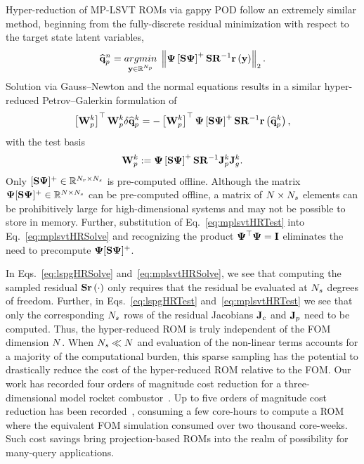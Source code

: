 Hyper-reduction of MP-LSVT ROMs via gappy POD follow an extremely similar method, beginning from the fully-discrete residual minimization with respect to the target state latent variables,
%
\begin{equation}
    \primVecCoef^{\timeIdx} = \argmin{\dummyVec \inROne{\numPrimModes}} \left\Vert \deimBasis \left[ \sampMat \deimBasis \right]^{+} \sampMat \resScaleInv \resFunc{\dummyVec} \right\Vert_2.
\end{equation}
%
Solution via Gauss--Newton and the normal equations results in a similar hyper-reduced Petrov--Galerkin formulation of
%
\begin{equation}\label{eq:mplsvtHRSolve}
    \left[ \testBasisPrim^\newtonIdx \right]^\top \testBasisPrim^\newtonIdx \delta \primVecCoef^{\newtonIdx} = -\left[\testBasisPrim^\newtonIdx \right]^\top \deimBasis \left[ \sampMat \deimBasis \right]^{+} \sampMat \resScaleInv \resFunc{\primVecCoef^{\newtonIdx}},
\end{equation}
%
with the test basis
%
\begin{equation}\label{eq:mplsvtHRTest}
    \testBasisPrim^\newtonIdx \defEq \deimBasis \left[ \sampMat \deimBasis \right]^{+} \sampMat \resScaleInv \jacobPrim^{\newtonIdx} \jacobDecode^{\newtonIdx}.
\end{equation}
%
Only $[ \sampMat \deimBasis ]^{+} \inRTwo{\numResModes}{\numSamps}$ is pre-computed offline. Although the matrix $\deimBasis [ \sampMat \deimBasis ]^{+} \inRTwo{\numDOF}{\numSamps}$ can be pre-computed offline, a matrix of $N \times N_s$ elements can be prohibitively large for high-dimensional systems and may not be possible to store in memory. Further, substitution of Eq.~\ref{eq:mplsvtHRTest} into Eq.~\ref{eq:mplsvtHRSolve} and recognizing the product $\deimBasis^\top \deimBasis = \identMat$ eliminates the need to precompute $\deimBasis [ \sampMat \deimBasis ]^{+}$.

In Eqs.~\ref{eq:lspgHRSolve} and~\ref{eq:mplsvtHRSolve}, we see that computing the sampled residual $\mathbf{S} \mathbf{r}\left(\cdot\right)$ only requires that the residual be evaluated at $N_s$ degrees of freedom. Further, in Eqs.~\ref{eq:lspgHRTest} and~\ref{eq:mplsvtHRTest} we see that only the corresponding $N_s$ rows of the residual Jacobians $\mathbf{J}_{c} $ and $\mathbf{J}_{p}$ need to be computed. Thus, the hyper-reduced ROM is truly independent of the FOM dimension $N$. When $N_s \ll N$ and evaluation of the non-linear terms accounts for a majority of the computational burden, this sparse sampling has the potential to drastically reduce the cost of the hyper-reduced ROM relative to the FOM. Our work has recorded four orders of magnitude cost reduction for a three-dimensional model rocket combustor~\cite{Wentland2021}. Up to five orders of magnitude cost reduction has been recorded~\cite{Grimberg2021}, consuming a few core-hours to compute a ROM where the equivalent FOM simulation consumed over two thousand core-weeks. Such cost savings bring projection-based ROMs into the realm of possibility for many-query applications.

